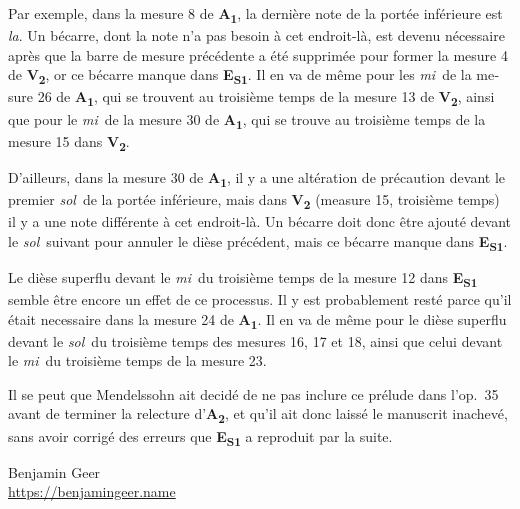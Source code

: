 \documentclass[a4paper, 12pt]{book}
\newcommand{\source}[2]{\textbf{#1\textsubscript{#2}}}
\begin{document}
{\begin{otherlanguage}{french}
    Par exemple, dans la mesure 8 de \source{A}{1}, la dernière note
    de la portée inférieure est \textit{la}\na. Un bécarre, dont la
    note n'a pas besoin à cet endroit-là, est devenu nécessaire après
    que la barre de mesure précédente a été supprimée pour former la
    mesure 4 de \source{V}{2}, or ce bécarre manque dans
    \source{E}{S1}. Il en va de même pour les \textit{mi}\na\ de la
    mesure 26 de \source{A}{1}, qui se trouvent au troisième temps de
    la mesure 13 de \source{V}{2}, ainsi que pour le \textit{mi}\na\ de la
    mesure 30 de \source{A}{1}, qui se trouve au troisième temps de la
    mesure 15 dans \source{V}{2}.

    D'ailleurs, dans la mesure 30 de \source{A}{1}, il y a une
    altération de précaution devant le premier \textit{sol}\na\ de la
    portée inférieure, mais dans \source{V}{2} (measure 15, troisième
    temps) il y a une note différente à cet endroit-là. Un bécarre
    doit donc être ajouté devant le \textit{sol}\na\ suivant pour
    annuler le dièse précédent, mais ce bécarre manque dans
    \source{E}{S1}.

    Le dièse superflu devant le \textit{mi}\sh\ du troisième temps de
    la mesure 12 dans \source{E}{S1} semble être encore un effet de ce
    processus.  Il y est probablement resté parce qu'il était
    necessaire dans la mesure 24 de \source{A}{1}. Il en va de même
    pour le dièse superflu devant le \textit{sol}\sh\ du troisième
    temps des mesures 16, 17 et 18, ainsi que celui devant le
    \textit{mi}\sh\ du troisième temps de la mesure 23.
    
    Il se peut que Mendelssohn ait decidé de ne pas inclure ce prélude
    dans l'op.\ 35 avant de terminer la relecture d'\source{A}{2}, et
    qu'il ait donc laissé le manuscrit inachevé, sans avoir corrigé
    des erreurs que \source{E}{S1} a reproduit par la suite.
    \end{otherlanguage}
  } {}

\raggedbottom

\vspace{\baselineskip}

\hfill
\begin{minipage}[t]{0.55\textwidth}
  Benjamin Geer \\
  \url{https://benjamingeer.name}
\end{minipage}

\pagebreak
\cleardoublepage
\mainmatter

\ifdef{\performance}
      {}
      {}
\end{document}
